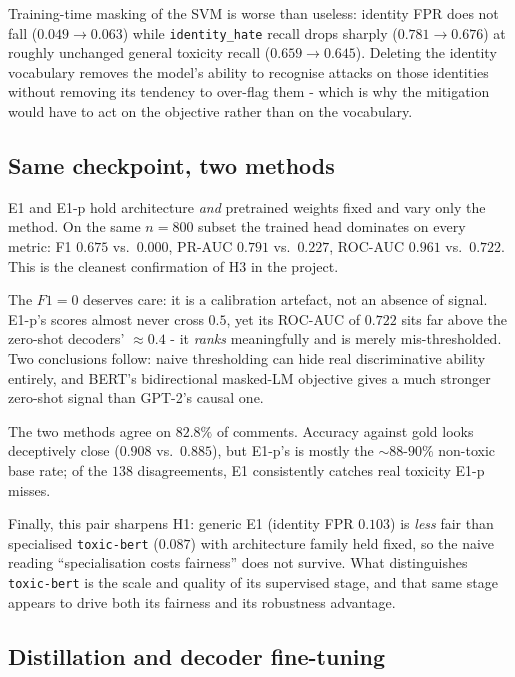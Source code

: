 \documentclass[10pt,a4paper]{article}
\begin{document}
Training-time masking of the SVM is worse than useless: identity FPR does not fall
($0.049 \to 0.063$) while \texttt{identity\_hate} recall drops sharply
($0.781 \to 0.676$) at roughly unchanged general toxicity recall ($0.659 \to 0.645$).
Deleting the identity vocabulary removes the model's ability to recognise attacks on
those identities without removing its tendency to over-flag them - which is why the
mitigation would have to act on the objective rather than on the vocabulary.

\subsection{Same checkpoint, two methods}
\label{sec:samecheckpoint}

E1 and E1-p hold architecture \emph{and} pretrained weights fixed and vary only
the method. On the same $n{=}800$ subset the trained head dominates on every
metric: F1 $0.675$ vs.\ $0.000$, PR-AUC $0.791$ vs.\ $0.227$, ROC-AUC $0.961$ vs.\
$0.722$. This is the cleanest confirmation of H3 in the project.

The $F1=0$ deserves care: it is a calibration artefact, not an absence of signal.
E1-p's scores almost never cross $0.5$, yet its ROC-AUC of $0.722$ sits far above the
zero-shot decoders' ${\approx}0.4$ - it \emph{ranks} meaningfully and is merely
mis-thresholded. Two conclusions follow: naive thresholding can hide real
discriminative ability entirely, and BERT's bidirectional masked-LM objective gives a
much stronger zero-shot signal than GPT-2's causal one.

The two methods agree on $82.8\%$ of comments. Accuracy against gold looks
deceptively close ($0.908$ vs.\ $0.885$), but E1-p's is mostly the ${\sim}88$-$90\%$
non-toxic base rate; of the $138$ disagreements, E1 consistently catches real
toxicity E1-p misses.

Finally, this pair sharpens H1: generic E1 (identity FPR $0.103$) is \emph{less} fair
than specialised \texttt{toxic-bert} ($0.087$) with architecture family held fixed, so
the naive reading ``specialisation costs fairness'' does not survive. What
distinguishes \texttt{toxic-bert} is the scale and quality of its supervised stage,
and that same stage appears to drive both its fairness and its robustness advantage.

\subsection{Distillation and decoder fine-tuning}
\label{sec:kd}
\end{document}
